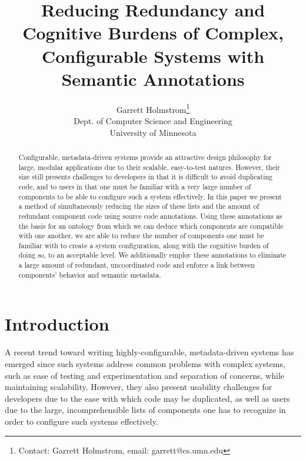 \documentclass{article}
\begin{document}
\title{Reducing Redundancy and Cognitive Burdens of Complex, Configurable Systems with Semantic Annotations}

\author{Garrett Holmstrom\thanks{Contact: Garrett Holmstrom, email: garrett@cs.umn.edu} \\ Dept. of Computer Science and Engineering \\ University of Minnesota
}

\maketitle

\begin{abstract}

Configurable, metadata-driven systems provide an attractive design philosophy for large, modular applications due to their scalable, easy-to-test natures.
However, their size still presents challenges to developers in that it is difficult to avoid duplicating code, and to users in that one must be familiar with a very large number of components to be able to configure such a system effectively.
In this paper we present a method of simultaneously reducing the sizes of these lists and the amount of redundant component code using source code annotations.
Using these annotations as the basis for an ontology from which we can deduce which components are compatible with one another, we are able to reduce the number of components one must be familiar with to create a system configuration, along with the cognitive burden of doing so, to an acceptable level.
We additionally employ these annotations to eliminate a large amount of redundant, uncoordinated code and enforce a link between components' behavior and semantic metadata.

\end{abstract}

\section{Introduction}

A recent trend toward writing highly-configurable, metadata-driven systems has emerged since such systems address common problems with complex systems, such as ease of testing and experimentation and separation of concerns, while maintaining scalability.
However, they also present usability challenges for developers due to the ease with which code may be duplicated, as well as users due to the large, incomprehensible lists of components one has to recognize in order to configure such systems effectively.
\end{document}
